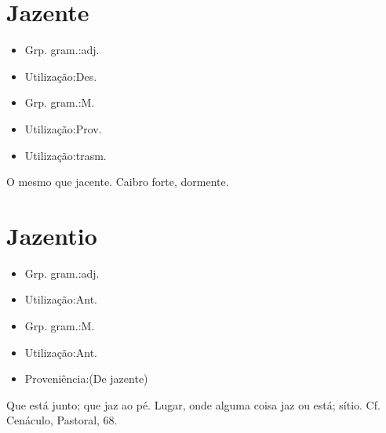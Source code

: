 \documentclass{article}
\begin{document}
\section{Jazente}
\begin{itemize}
\item {Grp. gram.:adj.}
\end{itemize}
\begin{itemize}
\item {Utilização:Des.}
\end{itemize}
\begin{itemize}
\item {Grp. gram.:M.}
\end{itemize}
\begin{itemize}
\item {Utilização:Prov.}
\end{itemize}
\begin{itemize}
\item {Utilização:trasm.}
\end{itemize}
O mesmo que \textunderscore jacente\textunderscore .
Caibro forte, dormente.
\section{Jazentio}
\begin{itemize}
\item {Grp. gram.:adj.}
\end{itemize}
\begin{itemize}
\item {Utilização:Ant.}
\end{itemize}
\begin{itemize}
\item {Grp. gram.:M.}
\end{itemize}
\begin{itemize}
\item {Utilização:Ant.}
\end{itemize}
\begin{itemize}
\item {Proveniência:(De \textunderscore jazente\textunderscore )}
\end{itemize}
Que está junto; que jaz ao pé.
Lugar, onde alguma coisa jaz ou está; sítio. Cf. Cenáculo, \textunderscore Pastoral\textunderscore , 68.
\end{document}

